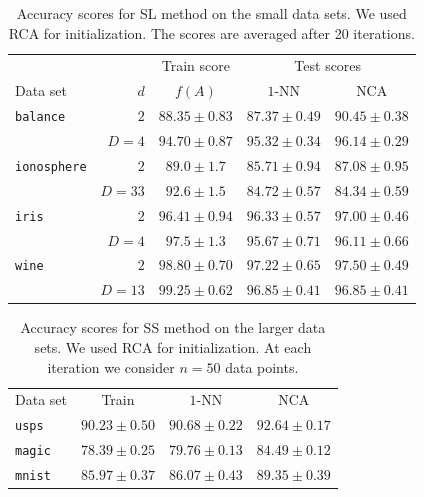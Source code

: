     \begin{table}
      \centering\begin{tabular}{lrccc}
      \toprule
	      &     & Train score  & \multicolumn{2}{c}{Test scores}\\
      \cmidrule(r){3-3} \cmidrule(r){4-5}
      Data set & $d$ & $f(A)$ & $1$-NN & NCA \\
      \midrule
	\texttt{balance}&$2$&$88.35 \pm 0.83$&$87.37 \pm 0.49$&$90.45 \pm 0.38$\\  
	&$D=4$&$94.70 \pm 0.87$&$95.32 \pm 0.34$&$96.14 \pm 0.29$\\ 
	\midrule
	\texttt{ionosphere}&$2$&$89.0 \pm 1.7$&$85.71 \pm 0.94$&$87.08 \pm 0.95$\\
	&$D=33$&$92.6 \pm 1.5$&$84.72 \pm 0.57$&$84.34 \pm 0.59$\\ 
	\midrule
	\texttt{iris}&$2$&$96.41 \pm 0.94$&$96.33 \pm 0.57$&$97.00 \pm 0.46$\\ 
	&$D=4$&$97.5 \pm 1.3$&$95.67 \pm 0.71$&$96.11 \pm 0.66$\\ 
	\midrule
	\texttt{wine}&$2$&$98.80 \pm 0.70$&$97.22 \pm 0.65$&$97.50 \pm 0.49$\\ 
	&$D=13$&$99.25 \pm 0.62$&$96.85 \pm 0.41$&$96.85 \pm 0.41$\\ 
      \bottomrule
      \end{tabular}
      \label{tab:sl-1}
      \caption{Accuracy scores for SL method on the small data sets. We used RCA for initialization. The scores are averaged after 20 iterations.}
    \end{table}

        \begin{table}
            	\centering
            	\begin{tabular}{lccc}
            	\toprule
            	Data set & Train & $1$-NN & NCA \\
            	\cmidrule(r){2-2}\cmidrule(r){3-4}
            	\texttt{usps}&$90.23  \pm 0.50$&$90.68 \pm 0.22$&$92.64 \pm 0.17$\\
            	\texttt{magic}&$78.39 \pm 0.25$&$79.76 \pm 0.13$&$84.49 \pm 0.12$\\
            	\texttt{mnist}&$85.97 \pm 0.37$&$86.07 \pm 0.43$&$89.35 \pm 0.39$\\
            	 \bottomrule
            	\end{tabular}
		\label{tab:sl-2}
		\caption{Accuracy scores for SS method on the larger data sets. We used RCA for initialization. At each iteration we consider $n=50$ data points.}
        \end{table}

